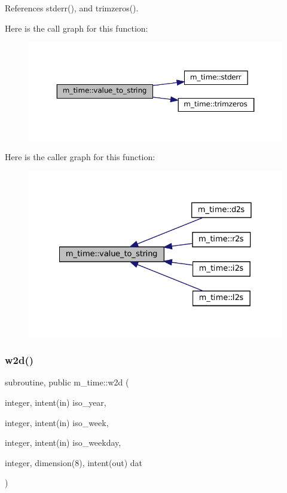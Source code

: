 References stderr(), and trimzeros().

Here is the call graph for this function\+:\nopagebreak
\begin{figure}[H]
\begin{center}
\leavevmode
\includegraphics[width=350pt]{namespacem__time_a0dac2380784afe63e06862095d589c22_cgraph}
\end{center}
\end{figure}
Here is the caller graph for this function\+:\nopagebreak
\begin{figure}[H]
\begin{center}
\leavevmode
\includegraphics[width=328pt]{namespacem__time_a0dac2380784afe63e06862095d589c22_icgraph}
\end{center}
\end{figure}
\mbox{\label{namespacem__time_ac0ec48db8d508bfa23fe4b20c9d1c5a3}} 
\subsubsection{\texorpdfstring{w2d()}{w2d()}}
{\footnotesize\ttfamily subroutine, public m\+\_\+time\+::w2d (\begin{DoxyParamCaption}\item[{integer, intent(in)}]{iso\+\_\+year,  }\item[{integer, intent(in)}]{iso\+\_\+week,  }\item[{integer, intent(in)}]{iso\+\_\+weekday,  }\item[{integer, dimension(8), intent(out)}]{dat }\end{DoxyParamCaption})}



